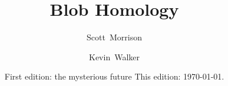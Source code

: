 
\title{Blob Homology}

\author{Scott~Morrison}
\address{
}%
 

\author{Kevin~Walker}
\address{
}%
 


\date{
  First edition: the mysterious future
  This edition: \today.
}


